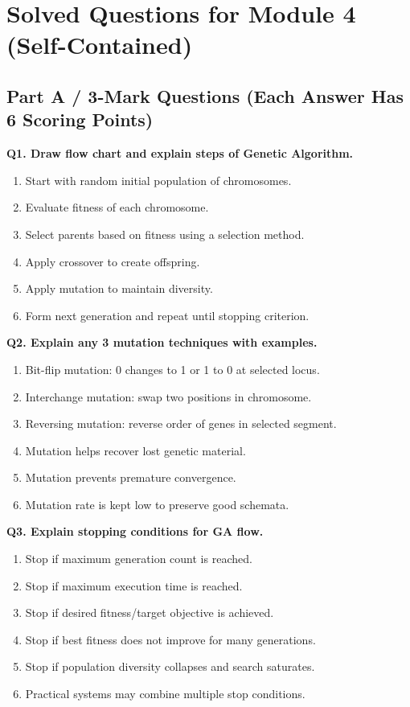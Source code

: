 \documentclass[11pt,a4paper]{article}
\begin{document}
\section*{Solved Questions for Module 4 (Self-Contained)}

\subsection*{Part A / 3-Mark Questions (Each Answer Has 6 Scoring Points)}

\textbf{Q1. Draw flow chart and explain steps of Genetic Algorithm.}
\begin{enumerate}
\item Start with random initial population of chromosomes.
\item Evaluate fitness of each chromosome.
\item Select parents based on fitness using a selection method.
\item Apply crossover to create offspring.
\item Apply mutation to maintain diversity.
\item Form next generation and repeat until stopping criterion.
\end{enumerate}

\textbf{Q2. Explain any 3 mutation techniques with examples.}
\begin{enumerate}
\item Bit-flip mutation: 0 changes to 1 or 1 to 0 at selected locus.
\item Interchange mutation: swap two positions in chromosome.
\item Reversing mutation: reverse order of genes in selected segment.
\item Mutation helps recover lost genetic material.
\item Mutation prevents premature convergence.
\item Mutation rate is kept low to preserve good schemata.
\end{enumerate}

\textbf{Q3. Explain stopping conditions for GA flow.}
\begin{enumerate}
\item Stop if maximum generation count is reached.
\item Stop if maximum execution time is reached.
\item Stop if desired fitness/target objective is achieved.
\item Stop if best fitness does not improve for many generations.
\item Stop if population diversity collapses and search saturates.
\item Practical systems may combine multiple stop conditions.
\end{enumerate}
\end{document}
